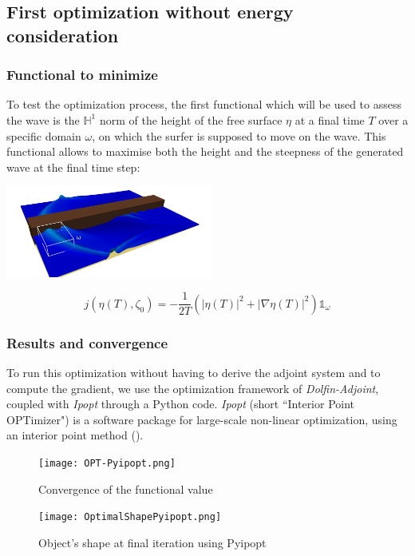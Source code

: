\documentclass[11pt,a4paper]{article}
\begin{document}
\subsection{First optimization without energy consideration}
\subsubsection{Functional to minimize}
	To test the optimization process, the first functional which will be used to assess the wave is the $\mathbb{H}^1$ norm of the height of the free surface  $\eta$ at a final time $T$ over a specific domain $\omega$, on which the surfer is supposed to move on the wave. This functional allows to maximise both the height and the steepness of the generated wave at the final time step:
	\begin{minipage}[c]{0.5\linewidth}
		\vspace{0pt}
		\centering
		\includegraphics[height=3cm]{OptimizationDomain}
	\end{minipage}	
	\begin{minipage}[c]{0.5\linewidth}
		\vspace{0pt}
		\begin{equation}
			j(\eta(T),\zeta_0) = - \frac{1}{2T}(|\eta(T)|^2 + |\nabla \eta(T)|^2) \mathds{1}_{\omega}
		\end{equation}
	\end{minipage}


	
	

\subsubsection{Results and convergence}		
	To run this optimization without having to derive the adjoint system and to compute the gradient, we use the optimization framework of \textit{Dolfin-Adjoint}, coupled with \textit{Ipopt} through a Python code.	\textit{Ipopt} (short ``Interior Point OPTimizer") is a software package for large-scale non-linear optimization, using an interior point method (\cite{IPOPT}). 
	\begin{figure}[!h]
		\begin{minipage}[t]{0.5\linewidth}
			\centering
			\texttt{[image: OPT-Pyipopt.png]}
			\caption{Convergence of the functional value}
		\end{minipage}
		\hspace{10pt}
		\begin{minipage}[t]{0.5\linewidth}
			\centering
			\texttt{[image: OptimalShapePyipopt.png]}
			\caption{Object's shape at final iteration using Pyipopt}
			\label{OptimalShapePyipot}
		\end{minipage}
	\end{figure}
	
\end{document}
